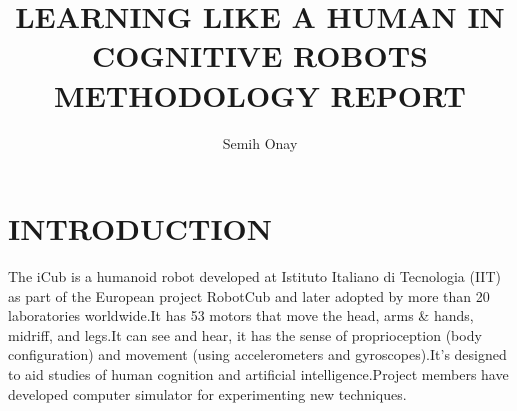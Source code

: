 \documentclass[12pt]{report}
\title{LEARNING LIKE A HUMAN IN COGNITIVE ROBOTS \\ METHODOLOGY REPORT}
\author{Semih Onay}
\begin{document}
\makecstitle

\chapter{INTRODUCTION}


The iCub is a humanoid robot developed at Istituto Italiano di Tecnologia (IIT) as part of the European project RobotCub and later adopted by more than 20 laboratories worldwide.It has 53 motors that move the head, arms \& hands, midriff, and legs.It can see and hear, it has the sense of proprioception (body configuration) and movement (using accelerometers and gyroscopes).It's designed to aid studies of human cognition and artificial intelligence.Project members have developed computer simulator for experimenting new techniques.\cite{iCub}
\end{document}
